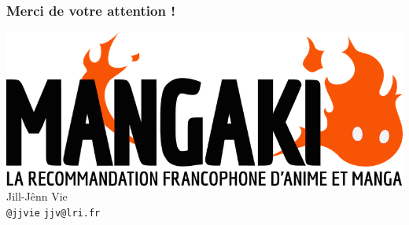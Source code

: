 \documentclass[handout]{beamer}
\begin{document}
\begin{frame}
	\frametitle{Merci de votre attention !}
	\centering
	\includegraphics{figures/mangaki.png}\\[8.4mm]
	\LARGE Jill-Jênn Vie\\[4.2mm]
	\texttt{@jjvie} \hfill \texttt{jjv@lri.fr}
\end{frame}
\end{document}
